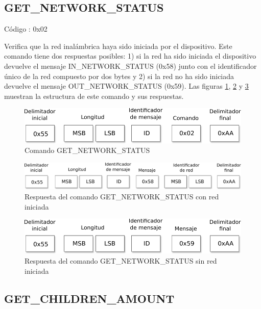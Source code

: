\subsection{GET\_NETWORK\_STATUS}

Código : 0x02

Verifica que la red inalámbrica haya sido iniciada por el dispositivo. Este comando tiene dos respuestas posibles: 1) si la red ha sido iniciada el dispositivo devuelve el mensaje IN\_NETWORK\_STATUS (0x58) junto con el identificador único de la red compuesto por dos bytes y 2) si la red no ha sido iniciada devuelve el mensaje OUT\_NETWORK\_STATUS (0x59). Las figuras \ref{fig:cmd_network_status}, \ref{fig:res1_network_status} y \ref{fig:res2_network_status} muestran la estructura de este comando y sus respuestas.  

\begin{figure}[h]
	\centering
	\includegraphics[scale=0.7]{capitulo_3_imgs/cmd_network_status.pdf}
	\caption{Comando GET\_NETWORK\_STATUS}
	\label{fig:cmd_network_status}
\end{figure}

\begin{figure}[h]
	\centering
	\includegraphics[scale=0.7]{capitulo_3_imgs/res1_network_status.pdf}
	\caption{Respuesta del comando GET\_NETWORK\_STATUS con red iniciada}
	\label{fig:res1_network_status}
\end{figure}

\begin{figure}[h]
	\centering
	\includegraphics[scale=0.7]{capitulo_3_imgs/res2_network_status.pdf}
	\caption{Respuesta del comando GET\_NETWORK\_STATUS sin red iniciada}
	\label{fig:res2_network_status}
\end{figure}

\subsection{GET\_CHILDREN\_AMOUNT}

